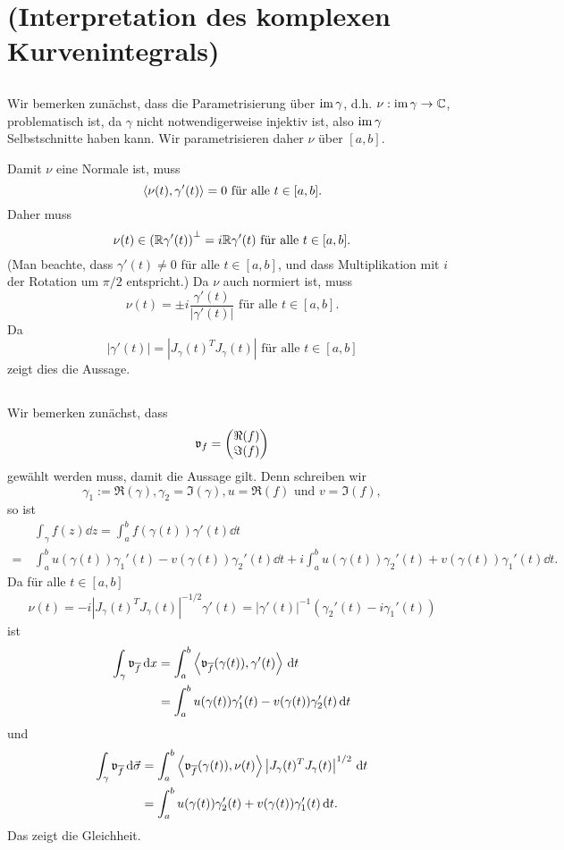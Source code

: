 \documentclass[a4paper,10pt]{article}
\begin{document}
\section{(Interpretation des komplexen Kurvenintegrals)}


\subsection{}
Wir bemerken zunächst, dass die Parametrisierung über $\operatorname{im} \gamma$, d.h. $\nu : \operatorname{im} \gamma \to \mathbb{C}$, problematisch ist, da $\gamma$ nicht notwendigerweise injektiv ist, also $\operatorname{im} \gamma$ Selbstschnitte haben kann. Wir parametrisieren daher $\nu$ über $[a,b]$.

Damit $\nu$ eine Normale ist, muss
\[
 \left\langle \nu(t), \gamma'(t) \right\rangle = 0 \text{ für alle } t \in [a,b].
\]
Daher muss
\[
 \nu(t) \in \left( \mathbb{R} \gamma'(t) \right)^{\bot} = i \mathbb{R} \gamma'(t) \text{ für alle } t \in [a,b].
\]
(Man beachte, dass $\gamma'(t) \neq 0$ für alle $t \in [a,b]$, und dass Multiplikation mit $i$ der Rotation um $\pi/2$ entspricht.) Da $\nu$ auch normiert ist, muss
\[
 \nu(t) = \pm i \frac{\gamma'(t)}{|\gamma'(t)|} \text{ für alle } t \in [a,b].
\]
Da
\[
 |\gamma'(t)| = \left|J_\gamma(t)^T J_\gamma(t)\right| \text{ für alle } t \in [a,b]
\]
zeigt dies die Aussage.


\subsection{}
Wir bemerken zunächst, dass
\[
 \mathfrak{v}_f = \begin{pmatrix}\Re(f) \\ \Im(f)\end{pmatrix}
\]
gewählt werden muss, damit die Aussage gilt. Denn schreiben wir
\[
 \gamma_1 := \Re(\gamma), \gamma_2 = \Im(\gamma), u = \Re(f) \text{ und } v = \Im(f),
\]
so ist
\begin{align*}
 &\, \int_\gamma f(z) \dd{z}
 = \int_a^b f(\gamma(t)) \gamma'(t) \dd{t} \\
 =&\, \int_a^b u(\gamma(t))\gamma_1'(t) - v(\gamma(t))\gamma_2'(t) \dd{t}
   + i \int_a^b u(\gamma(t)) \gamma_2'(t) + v(\gamma(t)) \gamma_1'(t) \dd{t}.
\end{align*}
Da für alle $t \in [a,b]$
\begin{align*}
 \nu(t) = -i\left|J_\gamma(t)^T J_\gamma(t)\right|^{-1/2} \gamma'(t) = |\gamma'(t)|^{-1} \left(\gamma_2'(t) - i\gamma_1'(t)\right)
\end{align*}
ist
\begin{align*}
 \int_\gamma \mathfrak{v}_{\overline{f}} \,\text{d}x
 &= \int_a^b \left\langle \mathfrak{v}_{\overline{f}}(\gamma(t)), \gamma'(t) \right\rangle \,\text{d}t \\
 &= \int_a^b u(\gamma(t))\gamma_1'(t) - v(\gamma(t))\gamma_2'(t) \,\text{d}t
\end{align*}
und
\begin{align*}
 \int_\gamma \mathfrak{v}_{\overline{f}} \,\text{d}\vec{\sigma}
 &= \int_a^b \left\langle \mathfrak{v}_{\overline{f}}(\gamma(t)), \nu(t) \right\rangle \left|J_\gamma(t)^T J_\gamma(t)\right|^{1/2} \,\text{d}t \\
 &= \int_a^b u(\gamma(t))\gamma_2'(t) + v(\gamma(t))\gamma_1'(t) \,\text{d}t.
\end{align*}
Das zeigt die Gleichheit.
\end{document}
